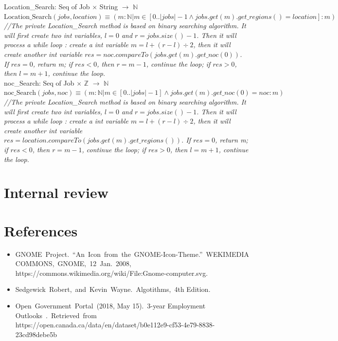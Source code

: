 \documentclass[12pt]{article}
\begin{document}
\noindent Location\_Search: Seq of Job $\times$ String  $ \rightarrow $ $\mathbb{N}$\\
\noindent $\text{Location\_Search}(jobs, location) \equiv (m: \mathbb{N} | m \in [0 .. |jobs|-1 \wedge jobs.get(m).get\_regions() = location]
: m)$\\

\noindent \textit{//The private Location\_Search method is based on binary searching algorithm. It will first create two int variables, $l = 0$ and $r = jobs.size()-1$. Then it will process a while loop : create a int variable $m = l + (r - l) \div 2$, then it will create another int variable $res = noc.compareTo(jobs.get(m).get\_noc(0))$. If $res = 0$, return m; if $res < 0$, then $r = m-1$, continue the loop; if $res > 0$, then $l = m + 1$, continue the loop.}\\

\noindent noc\_Search: Seq of Job $\times$ $\mathbb{Z}$  $ \rightarrow $ $\mathbb{N}$\\
\noindent $\text{noc\_Search}(jobs, noc) \equiv (m: \mathbb{N} | m \in [0 .. |jobs|-1] \wedge jobs.get(m).get\_noc(0) = noc
: m)$\\

\noindent \textit{//The private Location\_Search method is based on binary searching algorithm. It will first create two int variables, $l = 0$ and $r = jobs.size()-1$. Then it will process a while loop : create a int variable $m = l + (r - l) \div 2$, then it will create another int variable $res = location.compareTo(jobs.get(m).get\_regions())$. If $res = 0$, return m; if $res < 0$, then $r = m-1$, continue the loop; if $res > 0$, then $l = m + 1$, continue the loop.}\\

\section{Internal review}


\section{References}
\begin{itemize}
\item GNOME\ Project.\ “An\ Icon\ from\ the\ GNOME-Icon-Theme.”\ WEKIMEDIA\\ COMMONS,\ GNOME,\ 12\ Jan.\ 2008, https://commons.wikimedia.org/wiki/File:Gnome-computer.svg.
\item Sedgewick\ Robert,\ and\ Kevin\ Wayne.\ Algotithms,\ 4th Edition.
\item Open\ Government\ Portal\ (2018, May 15).\ 3-year Employment Outlooks\ .\ Retrieved\ from
https://open.canada.ca/data/en/dataset/b0e112e9-cf53-4e79-8838-23cd98debe5b
\end{itemize}
\end{document}
